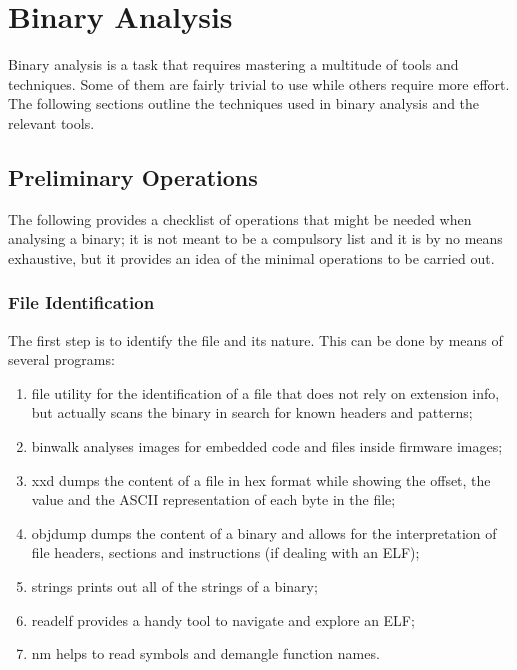 \chapter{Binary Analysis}
Binary analysis is a task that requires mastering a multitude of tools and techniques. Some of them are fairly trivial
to use while others require more effort. The following sections outline the techniques used in binary analysis and the
relevant tools.



\section{Preliminary Operations}
The following provides a checklist of operations that might be needed when analysing a binary; it is not meant to be a
compulsory list and it is by no means exhaustive, but it provides an idea of the minimal operations to be carried out.


\subsection{File Identification}
The first step is to identify the file and its nature. This can be done by means of several programs:
\begin{enumerate}
    \item {\ttfamily file} utility for the identification of a file that does not rely on extension info, but actually
        scans the binary in search for known headers and patterns;
    \item {\ttfamily binwalk} analyses images for embedded code and files inside firmware images;
    \item {\ttfamily xxd} dumps the content of a file in hex format while showing the offset, the value and the ASCII
        representation of each byte in the file;
    \item {\ttfamily objdump} dumps the content of a binary and allows for the interpretation of file headers, sections
        and instructions (if dealing with an ELF);
    \item {\ttfamily strings} prints out all of the strings of a binary;
    \item {\ttfamily readelf} provides a handy tool to navigate and explore an ELF;
    \item {\ttfamily nm} helps to read symbols and demangle function names.
\end{enumerate}


